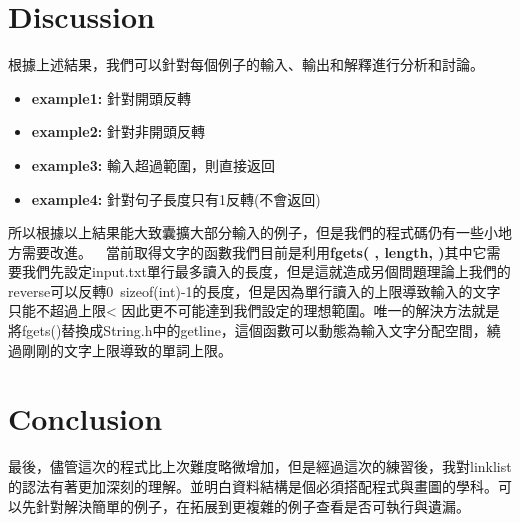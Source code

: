 \documentclass{article}
\begin{document}
	
	\section{Discussion}
	根據上述結果，我們可以針對每個例子的輸入、輸出和解釋進行分析和討論。
	\
	\begin{itemize}
		\item \textbf{example1:} 針對開頭反轉
		\item \textbf{example2:} 針對非開頭反轉
		\item \textbf{example3:} 輸入超過範圍，則直接返回
		\item \textbf{example4:} 針對句子長度只有1反轉(不會返回)
	\end{itemize}
	所以根據以上結果能大致囊擴大部分輸入的例子，但是我們的程式碼仍有一些小地方需要改進。\ \ 
	當前取得文字的函數我們目前是利用\textbf{fgets( , length, )}其中它需要我們先設定input.txt單行最多讀入的長度，但是這就造成另個問題理論上我們的reverse可以反轉0~sizeof(int)-1的長度，但是因為單行讀入的上限導致輸入的文字只能不超過上限<
	因此更不可能達到我們設定的理想範圍。唯一的解決方法就是將fgets()替換成String.h中的getline，這個函數可以動態為輸入文字分配空間，繞過剛剛的文字上限導致的單詞上限。

	\section{Conclusion}
	最後，儘管這次的程式比上次難度略微增加，但是經過這次的練習後，我對linklist的認法有著更加深刻的理解。並明白資料結構是個必須搭配程式與畫圖的學科。可以先針對解決簡單的例子，在拓展到更複雜的例子查看是否可執行與遺漏。
\end{document}
